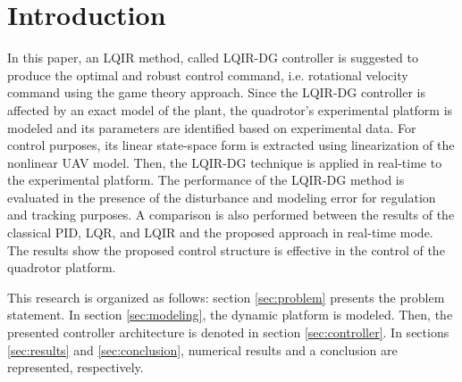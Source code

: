 \documentclass[preprint,12pt,authoryear]{elsarticle}
\begin{document}
\section{Introduction}\label{sec:intro}


In this paper, an LQIR method, called LQIR-DG controller is suggested to produce the optimal and robust control command, i.e. rotational velocity command using the game theory approach.
Since the LQIR-DG controller is affected by an exact model of the plant, the quadrotor's experimental platform is modeled and its parameters are identified based on experimental data. 
For control purposes, its linear state-space form is extracted using linearization of the nonlinear UAV model. %
Then, the LQIR-DG technique is applied in real-time to the experimental platform.
The performance of the LQIR-DG method is evaluated in the presence of the disturbance and modeling error for regulation and tracking purposes.
A comparison is also performed between the results of the classical PID, LQR, and LQIR and the proposed approach in real-time mode.
The results show the proposed control structure is effective in the control of the quadrotor platform.


This research is organized as follows: section \ref{sec:problem} presents the problem statement.
In section \ref{sec:modeling}, the dynamic platform is modeled. Then, the presented controller architecture is denoted in section \ref{sec:controller}. 
In sections \ref{sec:results} and \ref{sec:conclusion}, numerical results and a conclusion are represented, respectively.
\end{document}
